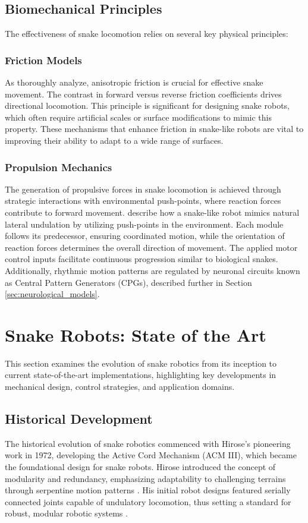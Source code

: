 \documentclass[12pt,a4paper]{report}
\begin{document}
\subsection{Biomechanical Principles}
The effectiveness of snake locomotion relies on several key physical principles:

\subsubsection{Friction Models}
  As \textcite{lamping-2022} thoroughly analyze, anisotropic friction is crucial for effective snake movement. The contrast in forward versus reverse friction coefficients drives directional locomotion. This principle is significant for designing snake robots, which often require artificial scales or surface modifications to mimic this property. These mechanisms that enhance friction in snake-like robots are vital to improving their ability to adapt to a wide range of surfaces.
 
\subsubsection{Propulsion Mechanics}
The generation of propulsive forces in snake locomotion is achieved through strategic interactions with environmental push-points, where reaction forces contribute to forward movement. \textcite{Bayraktaroglu2006} describe how a snake-like robot mimics natural lateral undulation by utilizing push-points in the environment. Each module follows its predecessor, ensuring coordinated motion, while the orientation of reaction forces determines the overall direction of movement. The applied motor control inputs facilitate continuous progression similar to biological snakes.
Additionally, rhythmic motion patterns are regulated by neuronal circuits known as Central Pattern Generators (CPGs), described further in Section \ref{sec:neurological_models}.

\section{Snake Robots: State of the Art}

This section examines the evolution of snake robotics from its inception to current state-of-the-art implementations, highlighting key developments in mechanical design, control strategies, and application domains.

\subsection{Historical Development}
The historical evolution of snake robotics commenced with Hirose's pioneering work in 1972, developing the Active Cord Mechanism (ACM III), which became the foundational design for snake robots. Hirose introduced the concept of modularity and redundancy, emphasizing adaptability to challenging terrains through serpentine motion patterns \cite{transeth-2009}. His initial robot designs featured serially connected joints capable of undulatory locomotion, thus setting a standard for robust, modular robotic systems \cite{Hirose2004}.
\end{document}
